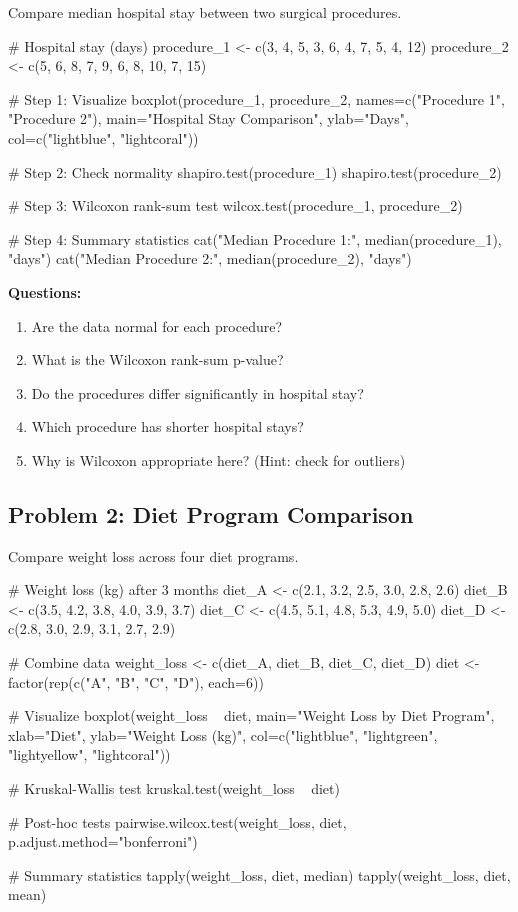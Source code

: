 \documentclass[11pt]{article}
\begin{document}
Compare median hospital stay between two surgical procedures.

\begin{rcode}
# Hospital stay (days)
procedure_1 <- c(3, 4, 5, 3, 6, 4, 7, 5, 4, 12)
procedure_2 <- c(5, 6, 8, 7, 9, 6, 8, 10, 7, 15)

# Step 1: Visualize
boxplot(procedure_1, procedure_2,
        names=c("Procedure 1", "Procedure 2"),
        main="Hospital Stay Comparison",
        ylab="Days",
        col=c("lightblue", "lightcoral"))

# Step 2: Check normality
shapiro.test(procedure_1)
shapiro.test(procedure_2)

# Step 3: Wilcoxon rank-sum test
wilcox.test(procedure_1, procedure_2)

# Step 4: Summary statistics
cat("Median Procedure 1:", median(procedure_1), "days\n")
cat("Median Procedure 2:", median(procedure_2), "days\n")
\end{rcode}

\textbf{Questions:}
\begin{enumerate}
\item Are the data normal for each procedure?
\item What is the Wilcoxon rank-sum p-value?
\item Do the procedures differ significantly in hospital stay?
\item Which procedure has shorter hospital stays?
\item Why is Wilcoxon appropriate here? (Hint: check for outliers)
\end{enumerate}

\vspace{1cm}

\subsection{Problem 2: Diet Program Comparison}

Compare weight loss across four diet programs.

\begin{rcode}
# Weight loss (kg) after 3 months
diet_A <- c(2.1, 3.2, 2.5, 3.0, 2.8, 2.6)
diet_B <- c(3.5, 4.2, 3.8, 4.0, 3.9, 3.7)
diet_C <- c(4.5, 5.1, 4.8, 5.3, 4.9, 5.0)
diet_D <- c(2.8, 3.0, 2.9, 3.1, 2.7, 2.9)

# Combine data
weight_loss <- c(diet_A, diet_B, diet_C, diet_D)
diet <- factor(rep(c("A", "B", "C", "D"), each=6))

# Visualize
boxplot(weight_loss ~ diet,
        main="Weight Loss by Diet Program",
        xlab="Diet",
        ylab="Weight Loss (kg)",
        col=c("lightblue", "lightgreen", "lightyellow", "lightcoral"))

# Kruskal-Wallis test
kruskal.test(weight_loss ~ diet)

# Post-hoc tests
pairwise.wilcox.test(weight_loss, diet, p.adjust.method="bonferroni")

# Summary statistics
tapply(weight_loss, diet, median)
tapply(weight_loss, diet, mean)
\end{rcode}
\end{document}
